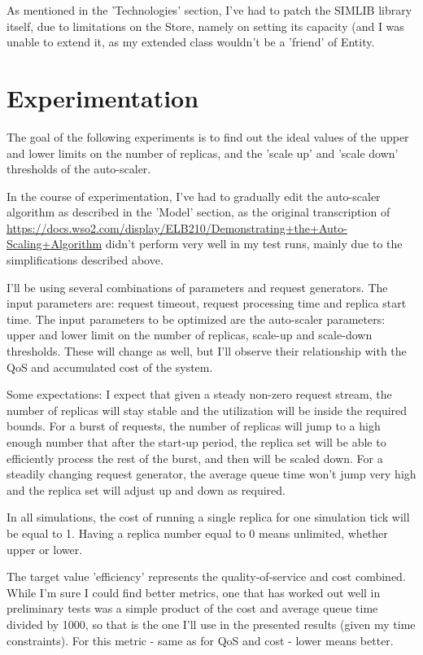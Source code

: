 \documentclass{scrartcl}
\begin{document}
As mentioned in the 'Technologies' section, I've had to patch the SIMLIB library
itself, due to limitations on the Store, namely on setting its capacity (and I
was unable to extend it, as my extended class wouldn't be a 'friend' of Entity.

\section{Experimentation}
\label{sec-5}
The goal of the following experiments is to find out the ideal values of the
upper and lower limits on the number of replicas, and the 'scale up' and 'scale
down' thresholds of the auto-scaler.

In the course of experimentation, I've had to gradually edit the auto-scaler
algorithm as described in the 'Model' section, as the original transcription of
\url{https://docs.wso2.com/display/ELB210/Demonstrating+the+Auto-Scaling+Algorithm}
didn't perform very well in my test runs, mainly due to the simplifications
described above.

I'll be using several combinations of parameters and request generators. The
input parameters are: request timeout, request processing time and replica start
time. The input parameters to be optimized are the auto-scaler parameters: upper
and lower limit on the number of replicas, scale-up and scale-down
thresholds. These will change as well, but I'll observe their relationship with
the QoS and accumulated cost of the system.

Some expectations: I expect that given a steady non-zero request stream, the
number of replicas will stay stable and the utilization will be inside the
required bounds. For a burst of requests, the number of replicas will jump to a
high enough number that after the start-up period, the replica set will be able
to efficiently process the rest of the burst, and then will be scaled down. For
a steadily changing request generator, the average queue time won't jump very
high and the replica set will adjust up and down as required.

In all simulations, the cost of running a single replica for one simulation tick
will be equal to 1. Having a replica number equal to 0 means unlimited, whether
upper or lower.

The target value 'efficiency' represents the quality-of-service and cost
combined. While I'm sure I could find better metrics, one that has worked out
well in preliminary tests was a simple product of the cost and average queue
time divided by 1000, so that is the one I'll use in the presented results
(given my time constraints). For this metric - same as for QoS and cost - lower
means better.
\end{document}
